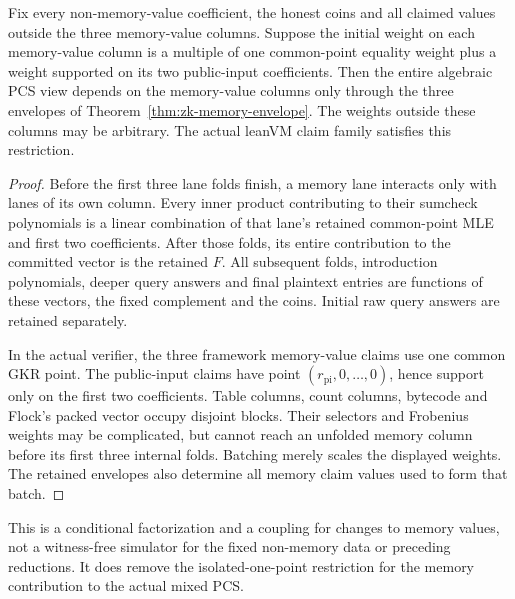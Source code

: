 \begin{proposition}\label{prop:zk-memory-pcs-isolation}
Fix every non-memory-value coefficient, the honest coins and all claimed values outside the three memory-value columns. Suppose the initial weight on each memory-value column is a multiple of one common-point equality weight plus a weight supported on its two public-input coefficients. Then the entire algebraic PCS view depends on the memory-value columns only through the three envelopes of Theorem~\ref{thm:zk-memory-envelope}. The weights outside these columns may be arbitrary. The actual leanVM claim family satisfies this restriction.
\end{proposition}
\begin{proof}
Before the first three lane folds finish, a memory lane interacts only with lanes of its own column. Every inner product contributing to their sumcheck polynomials is a linear combination of that lane's retained common-point MLE and first two coefficients. After those folds, its entire contribution to the committed vector is the retained $F$. All subsequent folds, introduction polynomials, deeper query answers and final plaintext entries are functions of these vectors, the fixed complement and the coins. Initial raw query answers are retained separately.

In the actual verifier, the three framework memory-value claims use one common GKR point. The public-input claims have point $(r_{\mathrm{pi}},0,\ldots,0)$, hence support only on the first two coefficients. Table columns, count columns, bytecode and Flock's packed vector occupy disjoint blocks. Their selectors and Frobenius weights may be complicated, but cannot reach an unfolded memory column before its first three internal folds. Batching merely scales the displayed weights. The retained envelopes also determine all memory claim values used to form that batch.
\end{proof}

This is a conditional factorization and a coupling for changes to memory values, not a witness-free simulator for the fixed non-memory data or preceding reductions. It does remove the isolated-one-point restriction for the memory contribution to the actual mixed PCS.

